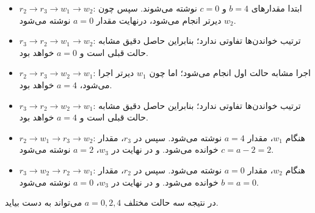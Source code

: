 \documentclass{article}
\begin{document}
	\begin{itemize}
		\item{
			$r_2 \rightarrow r_3 \rightarrow w_1 \rightarrow w_2$:
		}
		ابتدا مقدارهای
		$b = 4$
		و
		$c = 0$
		نوشته می‌شوند. سپس چون
		$w_2$
		دیرتر انجام می‌شود، درنهایت مقدار
		$a = 0$
		نوشته می‌شود.

		\item {
			$r_3 \rightarrow r_2 \rightarrow w_1 \rightarrow w_2$:
		}
		ترتیب خواندن‌ها تفاوتی ندارد؛ بنابراین حاصل دقیق مشابه حالت قبلی است و
		$a = 0$
		خواهد بود.

		\item{
			$r_2 \rightarrow r_3 \rightarrow w_2 \rightarrow w_1$:
		}
		اجرا مشابه حالت اول انجام می‌شود؛ اما چون
		$w_1$
		دیرتر اجرا می‌شود،
		$a = 4$
		خواهد بود.

		\item {
			$r_3 \rightarrow r_2 \rightarrow w_2 \rightarrow w_1$:
		}
		ترتیب خواندن‌ها تفاوتی ندارد؛ بنابراین حاصل دقیق مشابه حالت قبلی است و
		$a = 4$
		خواهد بود.

		\item {
			$r_2 \rightarrow w_1 \rightarrow r_3 \rightarrow w_2$:
		}
		هنگام
		$w_1$،
		مقدار
		$a = 4$
		نوشته می‌شود. سپس در
		$r_3$،
		مقدار
		$c = a - 2 = 2$
		خوانده می‌شود. و در نهایت در
		$w_3$،
		$a = 2$
		نوشته می‌شود.

		\item {
			$r_3 \rightarrow w_2 \rightarrow r_2 \rightarrow w_1$:
		}
		هنگام
		$w_2$،
		مقدار
		$a = 0$
		نوشته می‌شود. سپس در
		$r_2$،
		مقدار
		$b = a = 0$
		خوانده می‌شود. و در نهایت در
		$w_3$،
		$a = 0$
		نوشته می‌شود.
	\end{itemize}

	در نتیجه سه حالت مختلف
	$a = 0, 2, 4$
	می‌تواند به دست بیاید.
\end{document}
